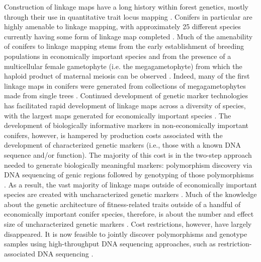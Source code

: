 \documentclass[11pt]{article}
\begin{document}
Construction of linkage maps have a long history within forest genetics, mostly through their use in quantitative trait locus 
mapping \citep{Ritland:2011}. 
Conifers in particular are highly amenable to linkage mapping, with approximately 25 different species currently having some 
form of linkage map completed \citep[see Table 5-1 in][]{Ritland:2011}. Much of the amenability of conifers to linkage mapping stems from 
the early establishment of breeding populations in economically important species and from the presence of a multicellular 
female gametophyte (i.e. the megagametophyte) from which the haploid product of maternal meiosis can be observed \citep{Cairney:2007}. 
Indeed, many of the first linkage maps in conifers were generated from collections of 
megagametophytes made from single trees \citep{Tulsieram:1992, Nelson:1993, Kubisiak:1996}. Continued development 
of genetic marker technologies has facilitated rapid development of linkage maps across a diversity of species, with the largest maps 
generated for economically important species \citep[e.g.][] {Achere:2004, Kang:2010, Martinez-Garcia:2013}. 
The development of biologically informative markers in non-economically important conifers, however, is hampered by production costs associated
with the development of characterized  genetic markers (i.e., those with a known DNA sequence and/or function). 
The majority of this cost is in the two-step approach needed to generate biologically 
meaningful markers: polymorphism discovery via DNA sequencing of genic regions followed by genotyping of those polymorphisms 
\citep[cf.][]{Eckert:2013a}. As a result, the vast majority of linkage maps outside of economically important 
species are created with uncharacterized genetic markers \citep[e.g.][]{Travis:1998}. Much of the knowledge about the genetic 
architecture of fitness-related traits outside of a handful of economically important conifer species, therefore, is about the 
number and effect size of uncharacterized genetic markers \citep{Ritland:2011}. Cost restrictions, however, have largely disappeared. 
It is now feasible to jointly discover polymorphisms and genotype samples using high-throughput DNA sequencing 
approaches, such as restriction-associated DNA sequencing \citep [RADseq; e.g.][] {Peterson:2012}. 
\end{document}
